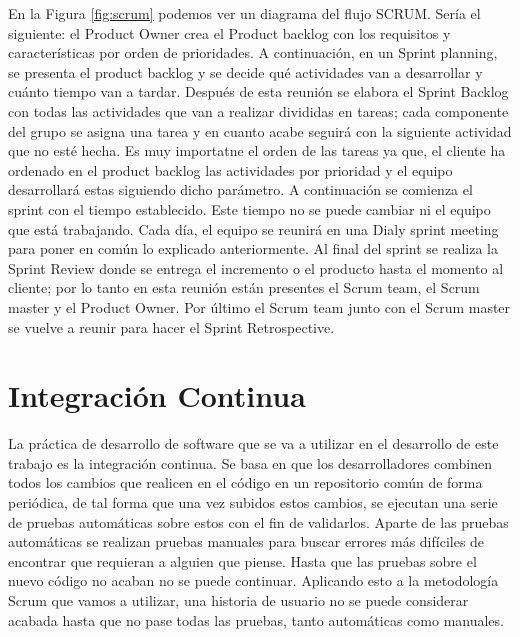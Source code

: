 	
	
	En la Figura \ref{fig:scrum} podemos ver un diagrama del flujo SCRUM. Sería el siguiente: el Product Owner crea el Product backlog con los requisitos y características por orden de prioridades. A continuación, en un Sprint planning, se presenta el product backlog y se decide qué actividades van a desarrollar y cuánto tiempo van a tardar. Después de esta reunión se elabora el Sprint Backlog con todas las actividades que van a realizar divididas en tareas; cada componente del grupo se asigna una tarea y en cuanto acabe seguirá con la siguiente actividad que no esté hecha. Es muy importatne el orden de las tareas ya que, el cliente ha ordenado en el product backlog las actividades por prioridad y el equipo desarrollará estas siguiendo dicho parámetro. A continuación se comienza el sprint con el tiempo establecido. Este tiempo no se puede cambiar ni el equipo que está trabajando. Cada día, el equipo se reunirá en una Dialy sprint meeting para poner en común lo explicado anteriormente. Al final del sprint se realiza la Sprint Review donde se entrega el incremento o el producto hasta el momento al cliente; por lo tanto en esta reunión están presentes el Scrum team, el Scrum master y el Product Owner. Por último el Scrum team junto con el Scrum master se vuelve a reunir para hacer el Sprint Retrospective.
	

\section{Integración Continua}
\label{cap2:sec:integracion}

La práctica de desarrollo de software que se va a utilizar en el desarrollo de este trabajo es la integración continua. Se basa en que los desarrolladores combinen todos los cambios que realicen en el código en un repositorio común de forma periódica, de tal forma que una vez subidos estos cambios, se ejecutan una serie de pruebas automáticas sobre estos con el fin de validarlos. Aparte de las pruebas automáticas se realizan pruebas manuales para buscar errores más difíciles de encontrar que requieran a alguien que piense. Hasta que las pruebas sobre el nuevo código no acaban no se puede continuar. Aplicando esto a la metodología Scrum que vamos a utilizar, una historia de usuario no se puede considerar acabada hasta que no pase todas las pruebas, tanto automáticas como manuales.

